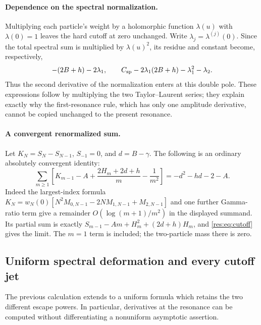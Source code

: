 \paragraph{Dependence on the spectral normalization.}
Multiplying each particle's weight by a holomorphic function
$\lambda(u)$ with $\lambda(0)=1$ leaves the hard cutoff at zero
unchanged.  Write $\lambda_j=\lambda^{(j)}(0)$.  Since the total
spectral sum is multiplied by $\lambda(u)^2$, its residue and
constant become, respectively,
\[
 -(2B+h)-2\lambda_1,\qquad
 C_{\rm sp}-2\lambda_1(2B+h)-\lambda_1^2-\lambda_2.
\]
Thus the second derivative of the normalization enters at this
double pole.  These expressions follow by multiplying the two
Taylor--Laurent series; they explain exactly why the first-resonance
rule, which has only one amplitude derivative, cannot be copied
unchanged to the present resonance.

\paragraph{A convergent renormalized sum.}
Let $K_N=S_N-S_{N-1}$, $S_{-1}=0$, and $d=B-\gamma$.
The following is an ordinary absolutely convergent identity:
\begin{equation}
 \sum_{m\geq1}\left[
 K_{m-1}-A+\frac{2H_m+2d+h}{m}-\frac1{m^2}\right]
   =-d^2-hd-2-A.\label{res:eq:mass-sum}
\end{equation}
Indeed the largest-index formula
$K_N=w_N(0)[N^2M_{0,N-1}-2NM_{1,N-1}+M_{2,N-1}]$
and one further Gamma-ratio term give a remainder
$O(\log(m+1)/m^2)$ in the displayed summand.  Its partial sum is
exactly $S_{m-1}-Am+H_m^2+(2d+h)H_m$, and
\eqref{res:eq:cutoff} gives the limit.  The $m=1$ term is included;
the two-particle mass there is zero.

\subsection{Uniform spectral deformation and every cutoff jet}
The previous calculation extends to a uniform formula which retains
the two different escape powers.  In particular, derivatives at the
resonance can be computed without differentiating a nonuniform
asymptotic assertion.

